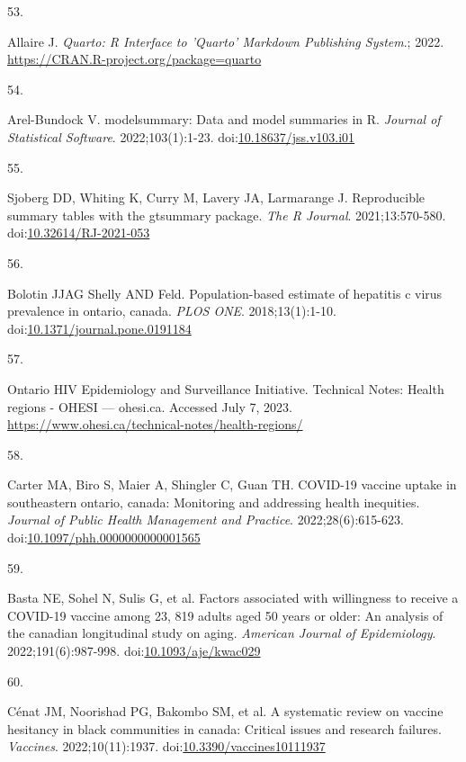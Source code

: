 \documentclass[
]{article}
\newlength{\cslhangindent}
\newlength{\csllabelwidth}
\newlength{\cslentryspacingunit} %
\newenvironment{CSLReferences}[2] %
 {%
  \setlength{\parindent}{0pt}
  \ifodd #1
  \let\oldpar\par
  \def\par{\hangindent=\cslhangindent\oldpar}
  \fi
  \setlength{\parskip}{#2\cslentryspacingunit}
 }%
 {}
\newcommand{\CSLLeftMargin}[1]{\parbox[t]{\csllabelwidth}{#1}}
\newcommand{\CSLRightInline}[1]{\parbox[t]{\linewidth - \csllabelwidth}{#1}\break}
\begin{document}
\begin{CSLReferences}{0}{0}
\leavevmode{}%
\CSLLeftMargin{53. }%
\CSLRightInline{Allaire J. \emph{Quarto: R Interface to 'Quarto'
Markdown Publishing System}.; 2022.
\url{https://CRAN.R-project.org/package=quarto}}

\leavevmode{}%
\CSLLeftMargin{54. }%
\CSLRightInline{Arel-Bundock V. {modelsummary}: Data and model summaries
in {R}. \emph{Journal of Statistical Software}. 2022;103(1):1-23.
doi:\href{https://doi.org/10.18637/jss.v103.i01}{10.18637/jss.v103.i01}}

\leavevmode{}%
\CSLLeftMargin{55. }%
\CSLRightInline{Sjoberg DD, Whiting K, Curry M, Lavery JA, Larmarange J.
Reproducible summary tables with the gtsummary package. \emph{{The R
Journal}}. 2021;13:570-580.
doi:\href{https://doi.org/10.32614/RJ-2021-053}{10.32614/RJ-2021-053}}

\leavevmode{}%
\CSLLeftMargin{56. }%
\CSLRightInline{Bolotin JJAG Shelly AND Feld. Population-based estimate
of hepatitis c virus prevalence in ontario, canada. \emph{PLOS ONE}.
2018;13(1):1-10.
doi:\href{https://doi.org/10.1371/journal.pone.0191184}{10.1371/journal.pone.0191184}}

\leavevmode{}%
\CSLLeftMargin{57. }%
\CSLRightInline{Ontario HIV Epidemiology and Surveillance Initiative.
{T}echnical {N}otes: {H}ealth regions - {O}{H}{E}{S}{I} --- ohesi.ca.
Accessed July 7, 2023.
\url{https://www.ohesi.ca/technical-notes/health-regions/}}

\leavevmode{}%
\CSLLeftMargin{58. }%
\CSLRightInline{Carter MA, Biro S, Maier A, Shingler C, Guan TH.
{COVID}-19 vaccine uptake in southeastern ontario, canada: Monitoring
and addressing health inequities. \emph{Journal of Public Health
Management and Practice}. 2022;28(6):615-623.
doi:\href{https://doi.org/10.1097/phh.0000000000001565}{10.1097/phh.0000000000001565}}

\leavevmode{}%
\CSLLeftMargin{59. }%
\CSLRightInline{Basta NE, Sohel N, Sulis G, et al. Factors associated
with willingness to receive a {COVID}-19 vaccine among 23, 819 adults
aged 50 years or older: An analysis of the canadian longitudinal study
on aging. \emph{American Journal of Epidemiology}. 2022;191(6):987-998.
doi:\href{https://doi.org/10.1093/aje/kwac029}{10.1093/aje/kwac029}}

\leavevmode{}%
\CSLLeftMargin{60. }%
\CSLRightInline{Cénat JM, Noorishad PG, Bakombo SM, et al. A systematic
review on vaccine hesitancy in black communities in canada: Critical
issues and research failures. \emph{Vaccines}. 2022;10(11):1937.
doi:\href{https://doi.org/10.3390/vaccines10111937}{10.3390/vaccines10111937}}


\end{CSLReferences}
\end{document}
